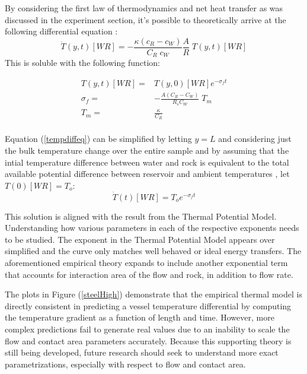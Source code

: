 By considering the first law of thermodynamics and net heat transfer as was discussed in the experiment section, it's possible to theoretically arrive at the following differential equation \citep{theoryKern}:
\begin{equation}\label{tempdiffeq}
 \dot{T}(y,t)[WR]=-\frac{\kappa(c_{R}-c_{W})}{C_{R}\;c_{W}}\frac{A}{R}\;T(y,t)[WR]
\end{equation}
This is soluble with the following function:
\begin{center}
\begin{equation}\label{solution}
\begin{aligned}
 T(y,t)[WR]=&T(y,0)[WR]e^{-\sigma_{f} t}\\
 \sigma_{f}=&-\frac{A(C_{R}-C_{W})}{R_{s}C_{W}}\;T_m\\
 T_m=&\frac{\kappa}{C_{R}}\\
\end{aligned}
\end{equation}
\end{center}
Equation (\ref{tempdiffeq}) can be simplified by letting $y=L$ and considering just the bulk temperature change over the entire sample and by assuming that the intial temperature difference between water and rock is equivalent to the total available potential difference between reservoir and ambient temperatures \citep{theoryKern}, let $T(0)[WR]=T_{o}$:
\begin{equation}\label{tempdiffeq2}
 \dot{T}(t)[WR]=T_{o}e^{-\sigma_{f} t}
\end{equation}

This solution is aligned with the result from the Thermal Potential Model. Understanding how various parameters in each of the respective exponents needs to be studied. The exponent in the Thermal Potential Model appears over simplified and the curve only matches well behaved or ideal energy transfers. The aforementioned empirical theory expands to include another exponential term that accounts for interaction area of the flow and rock, in addition to flow rate. 

The plots in Figure (\ref{steelHigh}) demonstrate that the empirical thermal model is directly consistent in predicting a vessel temperature differential by computing the temperature gradient as a function of length and time. However, more complex predictions fail to generate real values due to an inability to scale the flow and contact area parameters accurately. Because this supporting theory is still being developed, future research should seek to understand more exact parametrizations, especially with respect to flow and contact area.

